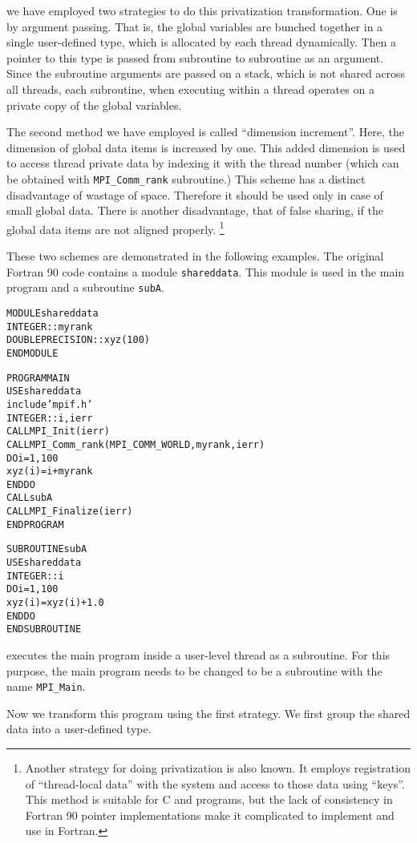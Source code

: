 \documentclass[10pt]{article}
\begin{document}
we have employed two strategies to do this privatization transformation. One is
by argument passing. That is, the global variables are bunched together in a
single user-defined type, which is allocated by each thread dynamically. Then a
pointer to this type is passed from subroutine to subroutine as an argument.
Since the subroutine arguments are passed on a stack, which is not shared
across all threads, each subroutine, when executing within a thread operates on
a private copy of the global variables. 

The second method we have employed is called ``dimension increment''. Here, the
dimension of global data items is increased by one. This added dimension is
used to access thread private data by indexing it with the thread number (which
can be obtained with \texttt{MPI\_Comm\_rank} subroutine.) This scheme has a
distinct disadvantage of wastage of space. Therefore it should be used only in
case of small global data. There is another disadvantage, that of false
sharing, if the global data items are not aligned properly.  \footnote{ Another
strategy for doing privatization is also known. It employs registration of
``thread-local data'' with the system and access to those data using ``keys''.
This method is suitable for C and \CC{} programs, but the lack of consistency
in Fortran 90 pointer implementations make it complicated to implement and use
in Fortran.}

These two schemes are demonstrated in the following examples. The original
Fortran 90 code contains a module \texttt{shareddata}. This module is used in
the main program and a subroutine \texttt{subA}.

\begin{alltt}
MODULE shareddata
  INTEGER :: myrank
  DOUBLE PRECISION :: xyz(100)
END MODULE

PROGRAM MAIN
  USE shareddata
  include 'mpif.h'
  INTEGER :: i, ierr
  CALL MPI_Init(ierr)
  CALL MPI_Comm_rank(MPI_COMM_WORLD, myrank, ierr)
  DO i = 1, 100
    xyz(i) =  i + myrank
  END DO
  CALL subA
  CALL MPI_Finalize(ierr)
END PROGRAM

SUBROUTINE subA
  USE shareddata
  INTEGER :: i
  DO i = 1, 100
    xyz(i) = xyz(i) + 1.0
  END DO
END SUBROUTINE
\end{alltt}

\ampi{} executes the main program inside a user-level thread as a subroutine.
For this purpose, the main program needs to be changed to be a subroutine with
the name \verb+MPI_Main+.

Now we transform this program using the first strategy. We first group the
shared data into a user-defined type.
\end{document}
